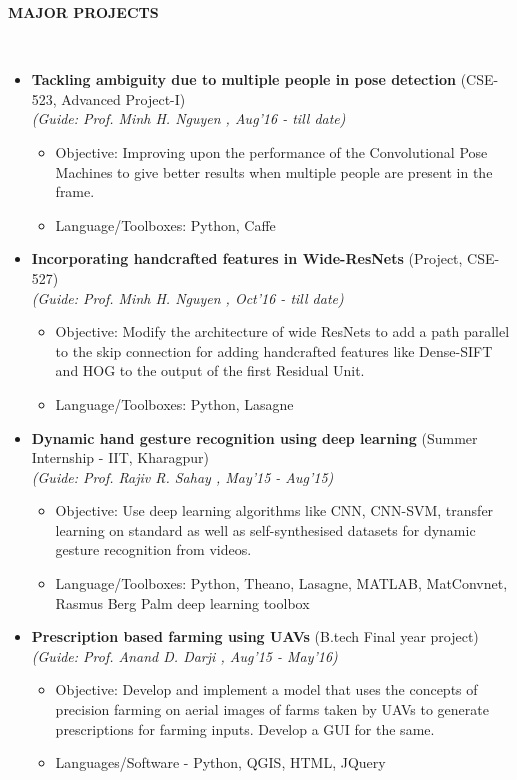 \documentclass[a4paper]{article}
\newcommand{\isep}{-2 pt}
\newcommand{\lsep}{-0.5cm}
\newcommand{\resheading}[1]{{\small \colorbox{mygrey}{\begin{minipage}{0.975\textwidth}{\textbf{#1 \vphantom{p\^{E}}}}\end{minipage}}}}
\begin{document}
\resheading{\textbf{MAJOR PROJECTS} }\\[\lsep]
\begin{itemize}
\item \textbf{Tackling ambiguity due to multiple people in pose detection
}(CSE-523, Advanced Project-I) \\
 \emph{(Guide: Prof. Minh H. Nguyen
, Aug'16 - till date)} \\[-0.6cm]
	\begin{itemize}\itemsep \isep
	\item Objective: Improving upon the performance of the Convolutional Pose Machines to give better results when multiple people are present in the frame.
	\item Language/Toolboxes: Python, Caffe
	\end{itemize}

\item \textbf{Incorporating handcrafted features in Wide-ResNets} (Project, CSE-527) \\
 \emph{(Guide: Prof. Minh H. Nguyen
, Oct'16 - till date)} \\[-0.6cm]
	\begin{itemize}\itemsep \isep
	\item Objective: Modify the architecture of wide ResNets to add a path parallel to the skip connection for adding handcrafted features like Dense-SIFT and HOG to the output of the first Residual Unit.
	\item Language/Toolboxes: Python, Lasagne
	\end{itemize}


\item \textbf{Dynamic hand gesture recognition using deep learning
}(Summer Internship - IIT, Kharagpur) \\
 \emph{(Guide: Prof. Rajiv R. Sahay
, May'15 - Aug'15)} \\[-0.6cm]
	\begin{itemize}\itemsep \isep
	\item Objective: Use deep learning algorithms like CNN, CNN-SVM, transfer learning on standard as well as self-synthesised datasets for dynamic gesture recognition from videos.
	\item Language/Toolboxes: Python, Theano, Lasagne, MATLAB, MatConvnet, Rasmus Berg Palm deep learning toolbox

	\end{itemize}

\item \textbf{Prescription based farming using UAVs
}(B.tech Final year project) \\
 \emph{(Guide: Prof. Anand D. Darji
, Aug'15 - May'16)} \\[-0.6cm]
	\begin{itemize}\itemsep \isep
	\item Objective: Develop and implement a model that uses the concepts of precision farming on aerial images of farms taken by UAVs to generate prescriptions for farming inputs. Develop a GUI for the same.
	\item Languages/Software - Python, QGIS, HTML, JQuery

	\end{itemize}
\end{itemize}
\end{document}

